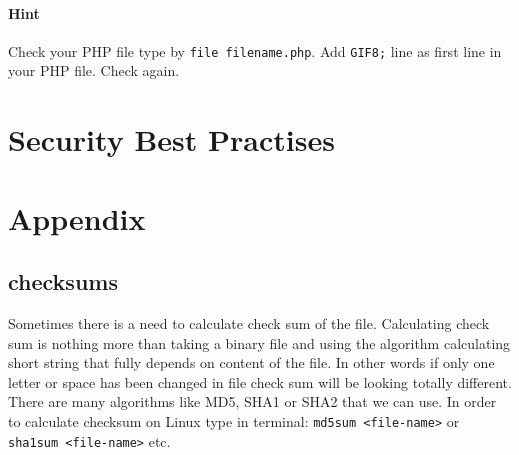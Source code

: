 \documentclass{article}[12pt]
\begin{document}
\paragraph{Hint} Check your PHP file type by \texttt{file filename.php}. Add \texttt{GIF8;} line as first line in your PHP file. Check again.






\section{Security Best Practises}





\section{Appendix}

\subsection{checksums}
Sometimes there is a need to calculate check sum of the file.
Calculating check sum is nothing more than taking a binary file and using the algorithm calculating short string that fully depends on content of the file.
In other words if only one letter or space has been changed in file check sum will be looking totally different.
There are many algorithms like MD5, SHA1 or SHA2 that we can use.
In order to calculate checksum on Linux type in terminal:
\texttt{md5sum <file-name>} or \texttt{sha1sum <file-name>} etc.

\end{document}
